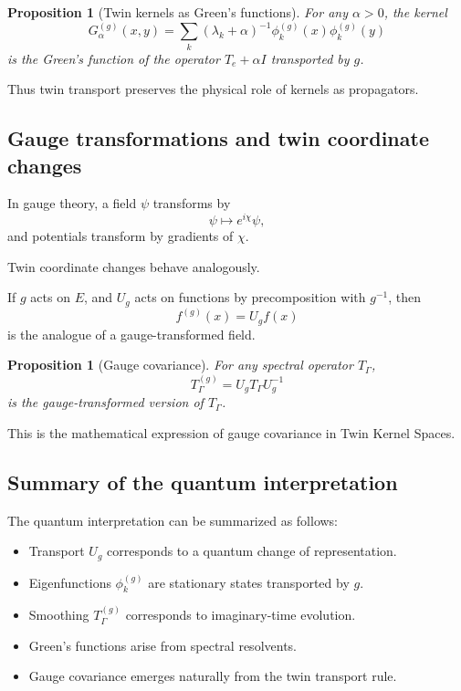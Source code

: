 \documentclass[11pt]{article}
\newtheorem{proposition}[theorem]{Proposition}
\theoremstyle{definition}
\begin{document}
\begin{proposition}[Twin kernels as Green’s functions]
	For any $\alpha>0$, the kernel
	\[
	G_\alpha^{(g)}(x,y) = \sum_k (\lambda_k+\alpha)^{-1}\phi_k^{(g)}(x)\phi_k^{(g)}(y)
	\]
	is the Green’s function of the operator $T_e+\alpha I$ transported by $g$.
\end{proposition}

Thus twin transport preserves the physical role of kernels as propagators.

\subsection{Gauge transformations and twin coordinate changes}

In gauge theory, a field $\psi$ transforms by
\[
\psi \mapsto e^{i\chi} \psi,
\]
and potentials transform by gradients of $\chi$.

Twin coordinate changes behave analogously.

If $g$ acts on $E$, and $U_g$ acts on functions by precomposition with $g^{-1}$, then
\[
f^{(g)}(x)=U_g f(x)
\]
is the analogue of a gauge-transformed field.

\begin{proposition}[Gauge covariance]
	For any spectral operator $T_\Gamma$,
	\[
	T_\Gamma^{(g)} = U_g T_\Gamma U_g^{-1}
	\]
	is the gauge-transformed version of $T_\Gamma$.
\end{proposition}

This is the mathematical expression of gauge covariance in Twin Kernel Spaces.

\subsection{Summary of the quantum interpretation}

The quantum interpretation can be summarized as follows:
\begin{itemize}[itemsep=2pt]
	\item Transport $U_g$ corresponds to a quantum change of representation.
	\item Eigenfunctions $\phi_k^{(g)}$ are stationary states transported by $g$.
	\item Smoothing $T_\Gamma^{(g)}$ corresponds to imaginary-time evolution.
	\item Green’s functions arise from spectral resolvents.
	\item Gauge covariance emerges naturally from the twin transport rule.
\end{itemize}
\end{document}
